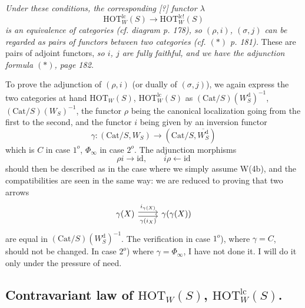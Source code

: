 \textit{Under these conditions, the corresponding [?] functor $\lambda$}
\[
\mathrm{HOT}^{\mathrm{lc}}_W(S) \longrightarrow \mathrm{HOT}^{\mathrm{lc!}}_W(S)
\]
\textit{is an equivalence of categories (cf. diagram p. 178), so $(\rho, i)$, $(\sigma, j)$ can be regarded as pairs of functors between two categories (cf. $(*)$ p. 181).} These are pairs of adjoint functors, \textit{so $i$, $j$ are fully faithful, and we have the adjunction formula $(*)$, page 182.}

To prove the adjunction of $(\rho, i)$ (or dually of $(\sigma, j)$), we again express the two categories at hand $\mathrm{HOT}_W(S)$, $\mathrm{HOT}^{\mathrm{lc}}_W(S)$ as $(\mathrm{Cat}/S)(W_S^{\mathrm{d}})^{-1}$, $(\mathrm{Cat}/S)(W_S)^{-1}$, the functor $\rho$ being the canonical localization going from the first to the second, and the functor $i$ being given by an inversion functor
\[
\gamma : (\mathrm{Cat}/S, W_S) \longrightarrow (\mathrm{Cat}/S, \overline{W_S^{\mathrm{d}}})
\]
which is $C$ in case $1^o$, $\Phi_\infty$ in case $2^o$. The adjunction morphisms
\[
\rho i \longrightarrow \mathrm{id}, \qquad i\rho \longleftarrow \mathrm{id}
\]
should then be described as in the case where we simply assume W(4b), and the compatibilities are seen in the same way: we are reduced to proving that two arrows
\[
\begin{tikzcd}
\gamma(X) \arrow[r, shift left, "i_{\gamma(X)}"] \arrow[r, shift right, "\gamma(i_X)"'] & \gamma(\gamma(X))
\end{tikzcd}
\]
are equal in $(\mathrm{Cat}/S)(W_S^{\mathrm{d}})^{-1}$. The verification in case $1^o$), where $\gamma = C$, should not be changed. In case $2^o$) where $\gamma = \Phi_\infty$, I have not done it. I will do it only under the pressure of need.

\subsection*{ Contravariant law of $\mathrm{HOT}_W(S)$, $\mathrm{HOT}^{\mathrm{lc}}_W(S)$.}

